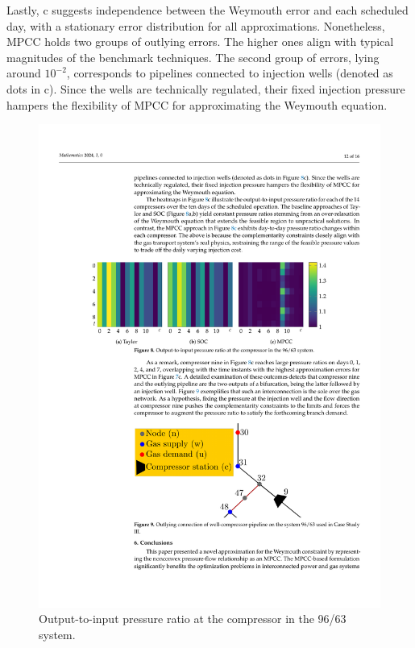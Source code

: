 Lastly, c suggests independence between the Weymouth error and each scheduled day, with a stationary error distribution for all approximations. Nonetheless, MPCC holds two groups of outlying errors. The higher ones align with typical magnitudes of the benchmark techniques. The second group of errors, lying around $10^{-2}$, corresponds to pipelines connected to injection wells (denoted as dots in c). Since the wells are technically regulated, their fixed injection pressure hampers the flexibility of MPCC for approximating the Weymouth equation.

\begin{figure}[h]
\centering %
 \includegraphics[scale=0.8]{figures/Chapter_MPCC/g007.pdf}
\caption{Output-to-input pressure ratio at the compressor in the  96/63 system. }
\label{fig:red_test_heatmaps}
\end{figure}


